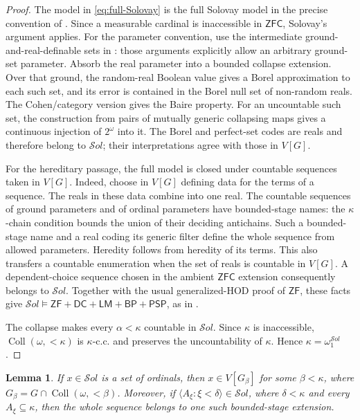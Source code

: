 \documentclass[11pt,a4paper]{amsart}
\newcommand{\ZF}{\mathsf{ZF}}
\newcommand{\ZFC}{\mathsf{ZFC}}
\newcommand{\Coll}{\operatorname{Coll}}
\newcommand{\DC}{\mathsf{DC}}
\newcommand{\LM}{\mathsf{LM}}
\newcommand{\BP}{\mathsf{BP}}
\newcommand{\PSP}{\mathsf{PSP}}
\theoremstyle{plain}
\newtheorem{lemma}[theorem]{Lemma}
\theoremstyle{definition}
\theoremstyle{remark}
\begin{document}
\begin{proof}
{\color{auditgreen}
The model in \eqref{eq:full-Solovay} is the full Solovay model in the precise convention of \cite[Definition~4 and the following paragraph]{SakaiTanno}.  Since a measurable cardinal is inaccessible in $\ZFC$, Solovay's argument applies.  For the parameter convention, use the intermediate ground-and-real-definable sets in \cite[III, Sections~1.3--1.11]{Solovay}: those arguments explicitly allow an arbitrary ground-set parameter.  Absorb the real parameter into a bounded collapse extension.  Over that ground, the random-real Boolean value gives a Borel approximation to each such set, and its error is contained in the Borel null set of non-random reals.  The Cohen/category version gives the Baire property.  For an uncountable such set, the construction from pairs of mutually generic collapsing maps gives a continuous injection of $2^\omega$ into it.  The Borel and perfect-set codes are reals and therefore belong to $\mathcal S\!ol$; their interpretations agree with those in $V[G]$.

For the hereditary passage, the full model is closed under countable sequences taken in $V[G]$.  Indeed, choose in $V[G]$ defining data for the terms of a sequence.  The reals in these data combine into one real.  The countable sequences of ground parameters and of ordinal parameters have bounded-stage names: the $\kappa$-chain condition bounds the union of their deciding antichains.  Such a bounded-stage name and a real coding its generic filter define the whole sequence from allowed parameters.  Heredity follows from heredity of its terms.  This also transfers a countable enumeration when the set of reals is countable in $V[G]$.  A dependent-choice sequence chosen in the ambient $\ZFC$ extension consequently belongs to $\mathcal S\!ol$.  Together with the usual generalized-HOD proof of $\ZF$, these facts give $\mathcal S\!ol\models\ZF+\DC+\LM+\BP+\PSP$, as in \cite[III, Sections~2.4--2.11]{Solovay}.
}

The collapse makes every $\alpha<\kappa$ countable in $\mathcal S\!ol$.  Since $\kappa$ is inaccessible, ${\Coll}(\omega,{<}\kappa)$ is $\kappa$-c.c. and preserves the uncountability of $\kappa$.  Hence $\kappa=\omega_1^{\mathcal S\!ol}$.
\end{proof}

\begin{lemma}\label{lem:Solovay-localization}
If $x\in\mathcal S\!ol$ is a set of ordinals, then
$x\in V[G_\beta]$ for some $\beta<\kappa$, where
$G_\beta=G\cap{\Coll}(\omega,{<}\beta)$.  Moreover, if
$\langle A_\xi:\xi<\delta\rangle\in\mathcal S\!ol$, where
$\delta<\kappa$ and every $A_\xi\subseteq\kappa$, then the whole sequence belongs to one such bounded-stage extension.
\end{lemma}
\end{document}

